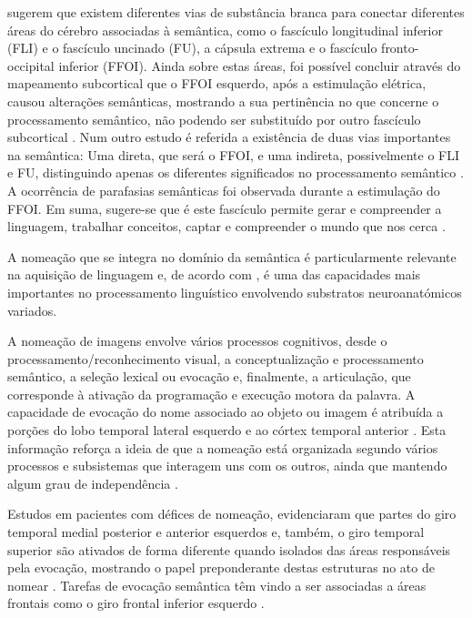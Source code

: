 \documentclass[output=paper,colorlinks,citecolor=brown,booklanguage=portuguese]{langscibook}
\begin{document}
\citet{Bertani2009} sugerem que existem diferentes vias de substância branca para conectar diferentes áreas do cérebro associadas à semântica, como o fascículo longitudinal inferior (FLI) e o fascículo uncinado (FU), a cápsula extrema e o fascículo fronto-occipital inferior (FFOI). Ainda sobre estas áreas, foi possível concluir através do mapeamento subcortical que o FFOI esquerdo, após a estimulação elétrica, causou alterações semânticas, mostrando a sua pertinência no que concerne o processamento semântico, não podendo ser substituído por outro fascículo subcortical \citep{MoritzGasser2013a}. Num outro estudo é referida a existência de duas vias importantes na semântica: Uma direta, que será o FFOI, e uma indireta, possivelmente o FLI e FU, distinguindo apenas os diferentes significados no processamento semântico \citep{MoritzGasser2013}. A ocorrência de parafasias semânticas foi observada durante a estimulação do FFOI. Em suma, sugere-se que é este fascículo permite gerar e compreender a linguagem, trabalhar conceitos, captar e compreender o mundo que nos cerca \citep{MoritzGasser2013a}.

A nomeação que se integra no domínio da semântica é particularmente relevante na aquisição de linguagem \citep{Fecteau2011} e, de acordo com \citet{Spezzano2010}, é uma das capacidades mais importantes no processamento linguístico envolvendo substratos neuroanatómicos variados.

A nomeação de imagens envolve vários processos cognitivos, desde o processamento/reconhecimento visual, a conceptualização e processamento semântico, a seleção lexical ou evocação e, finalmente, a articulação, que corresponde à ativação da programação e execução motora da palavra. A capacidade de evocação do nome associado ao objeto ou imagem é atribuída a porções do lobo temporal lateral esquerdo e ao córtex temporal anterior \citep{Baldo2013}. Esta informação reforça a ideia de que a nomeação está organizada segundo vários processos e subsistemas que interagem uns com os outros, ainda que mantendo algum grau de independência \citep{Matchin2019}. 

Estudos em pacientes com défices de nomeação, evidenciaram que partes do giro temporal medial posterior e anterior esquerdos e, também, o giro temporal superior são ativados de forma diferente quando isolados das áreas responsáveis pela evocação, mostrando o papel preponderante destas estruturas no ato de nomear \citep{Baldo2013, Strijkers2017}. Tarefas de evocação semântica têm vindo a ser associadas a áreas frontais como o giro frontal inferior esquerdo \citep{Ries2019}.
\end{document}
